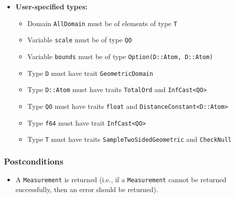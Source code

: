 \documentclass[11pt,a4paper]{article}
\newcommand{\vicki}[1]{{ {\color{olive}{(vicki)~#1}}}}
\begin{document}
\begin{itemize}
    \item \textbf{User-specified types:}
    \begin{itemize}
        \item Domain \texttt{AllDomain} must be of elements of type \texttt{T}
        \item Variable \texttt{scale} must be of type \texttt{QO}
        \item Variable \texttt{bounds} must be of type \texttt{Option(D::Atom, D::Atom)}
        \item Type \texttt{D} must have trait \texttt{GeometricDomain}
        \item Type \texttt{D::Atom} must have traits \texttt{TotalOrd} and \texttt{InfCast<QO>}
        \item Type \texttt{QO} must have traits \texttt{float} and \texttt{DistanceConstant<D::Atom>} 
        \item Type \texttt{f64} must have trait \texttt{InfCast<QO>}
        \item Type \texttt{T} must have traits \texttt{SampleTwoSidedGeometric} and \texttt{CheckNull}
    \end{itemize}
\end{itemize}

\vicki{not sure about the domain/T stuff; it's mentioned in the implementation of the domain so I figured should also have it here} 

\subsubsection*{Postconditions}

\begin{itemize}
    \item A \texttt{Measurement} is returned (i.e., if a \texttt{Measurement} cannot be returned successfully, then an error should be returned).
\end{itemize}
\end{document}
